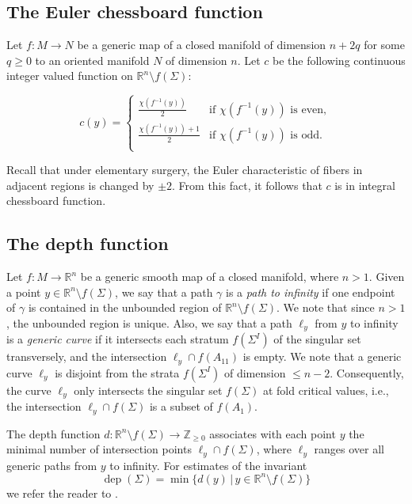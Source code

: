 \documentclass[12pt]{amsart}
\def \R{\mathbb{R}}
\def \Z{\mathbb{Z}}
\def\co{\colon}
\theoremstyle{definition}
\begin{document}
\subsection{The Euler chessboard function}

Let $f\co M\to N$ be a generic map of a closed manifold of dimension $n+2q$ for some $q\ge 0$ to an oriented manifold $N$ of dimension $n$. Let $c$ be the following continuous integer valued function on $\R^n\setminus f(\Sigma)$:



\[
     c(y) = \begin{cases} 
              \frac{\chi(f^{-1}(y))}{2}  &  \text{if } \chi(f^{-1}(y)) \text{ is even}, \\
              \frac{\chi(f^{-1}(y))+1}{2} & \text{if } \chi(f^{-1}(y)) \text{ is odd}. \\
              \end{cases}
\]

Recall that under elementary surgery,  the Euler characteristic of fibers in adjacent regions is changed by $\pm 2$.  From this fact, it follows that $c$ is in integral chessboard function. 

\subsection{The depth function}

Let $f\co M\to \R^n$ be a generic smooth map of a closed manifold, where $n>1$. Given a point $y\in \R^n\setminus f(\Sigma)$,  we say that a path $\gamma$ is a \emph{path to infinity} if one endpoint of $\gamma$ is contained in the unbounded region of $\R^n\setminus f(\Sigma)$. We note that since $n>1$, the unbounded region is unique.  Also, we say that a path $\ell_y$ from $y$ to infinity is a \emph{generic curve} if it intersects each stratum $f(\Sigma^I)$ of the singular set transversely,  and the intersection $\ell_y \cap f(A_{11})$ is empty.  We note that a generic curve $\ell_y$ is disjoint from the strata $f(\Sigma^I)$ of dimension $\le n-2$. Consequently, the curve $\ell_y$ only intersects the singular set $f(\Sigma)$ at fold critical values, i.e., the intersection $\ell_y\cap f(\Sigma)$ is a subset of $f(A_1)$. 

The depth function $d\co \R^n\setminus f(\Sigma)\to \Z_{\ge 0}$ associates with each point $y$  the minimal number of intersection points $\ell_y\cap f(\Sigma)$,  where $\ell_y$ ranges over all generic paths from $y$ to infinity.  For estimates of the invariant 
\[
\mathop\mathrm{dep}(\Sigma)=\min\{d(y)\, |\, y\in \R^n\setminus f(\Sigma)\}
\]
 we refer the reader to  \cite{Gr}.  
 
\end{document}
